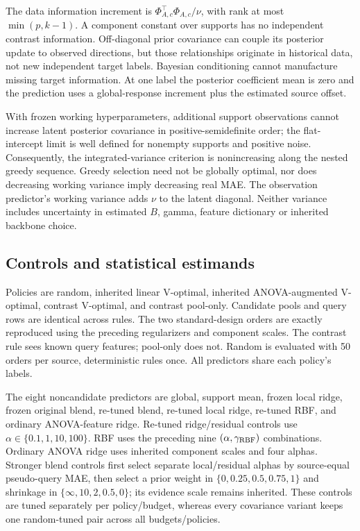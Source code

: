 \documentclass[11pt]{article}
\begin{document}
The data information increment is $\Phi_{A,c}^\top\Phi_{A,c}/\nu$, with rank at most $\min(p,k-1)$. A component constant over supports has no independent contrast information. Off-diagonal prior covariance can couple its posterior update to observed directions, but those relationships originate in historical data, not new independent target labels. Bayesian conditioning cannot manufacture missing target information. At one label the posterior coefficient mean is zero and the prediction uses a global-response increment plus the estimated source offset.

With frozen working hyperparameters, additional support observations cannot increase latent posterior covariance in positive-semidefinite order; the flat-intercept limit is well defined for nonempty supports and positive noise. Consequently, the integrated-variance criterion is nonincreasing along the nested greedy sequence. Greedy selection need not be globally optimal, nor does decreasing working variance imply decreasing real MAE. The observation predictor's working variance adds $\nu$ to the latent diagonal. Neither variance includes uncertainty in estimated $B$, gamma, feature dictionary or inherited backbone choice.

\subsection{Controls and statistical estimands}
Policies are random, inherited linear V-optimal, inherited ANOVA-augmented V-optimal, contrast V-optimal, and contrast pool-only. Candidate pools and query rows are identical across rules. The two standard-design orders are exactly reproduced using the preceding regularizers and component scales. The contrast rule sees known query features; pool-only does not. Random is evaluated with 50 orders per source, deterministic rules once. All predictors share each policy's labels.

The eight noncandidate predictors are global, support mean, frozen local ridge, frozen original blend, re-tuned blend, re-tuned local ridge, re-tuned RBF, and ordinary ANOVA-feature ridge. Re-tuned ridge/residual controls use $\alpha\in\{0.1,1,10,100\}$. RBF uses the preceding nine $(\alpha,\gamma_{\rm RBF})$ combinations. Ordinary ANOVA ridge uses inherited component scales and four alphas. Stronger blend controls first select separate local/residual alphas by source-equal pseudo-query MAE, then select a prior weight in $\{0,0.25,0.5,0.75,1\}$ and shrinkage in $\{\infty,10,2,0.5,0\}$; its evidence scale remains inherited. These controls are tuned separately per policy/budget, whereas every covariance variant keeps one random-tuned pair across all budgets/policies.
\end{document}
